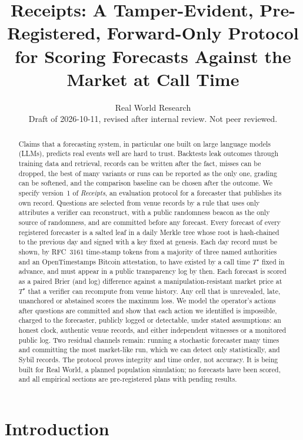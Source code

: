 \documentclass[11pt]{article}
\title{Receipts: A Tamper-Evident, Pre-Registered, Forward-Only Protocol\\for Scoring Forecasts Against the Market at Call Time}
\author{Real World Research\\\small Draft of 2026-10-11, revised after internal review. Not peer reviewed.}
\date{}
\newcommand{\Ts}{T^{\star}}
\begin{document}
\sloppy
\maketitle

\begin{abstract}
Claims that a forecasting system, in particular one built on large language models (LLMs), predicts real events well are hard to trust. Backtests leak outcomes through training data and retrieval, records can be written after the fact, misses can be dropped, the best of many variants or runs can be reported as the only one, grading can be softened, and the comparison baseline can be chosen after the outcome. We specify version~1 of \emph{Receipts}, an evaluation protocol for a forecaster that publishes its own record. Questions are selected from venue records by a rule that uses only attributes a verifier can reconstruct, with a public randomness beacon as the only source of randomness, and are committed before any forecast. Every forecast of every registered forecaster is a salted leaf in a daily Merkle tree whose root is hash-chained to the previous day and signed with a key fixed at genesis. Each day record must be shown, by RFC~3161 time-stamp tokens from a majority of three named authorities and an OpenTimestamps Bitcoin attestation, to have existed by a call time $\Ts$ fixed in advance, and must appear in a public transparency log by then. Each forecast is scored as a paired Brier (and log) difference against a manipulation-resistant market price at $\Ts$ that a verifier can recompute from venue history. Any cell that is unrevealed, late, unanchored or abstained scores the maximum loss. We model the operator's actions after questions are committed and show that each action we identified is impossible, charged to the forecaster, publicly logged or detectable, under stated assumptions: an honest clock, authentic venue records, and either independent witnesses or a monitored public log. Two residual channels remain: running a stochastic forecaster many times and committing the most market-like run, which we can detect only statistically, and Sybil records. The protocol proves integrity and time order, not accuracy. It is being built for Real World, a planned population simulation; no forecasts have been scored, and all empirical sections are pre-registered plans with pending results.
\end{abstract}

\section{Introduction}
\end{document}
